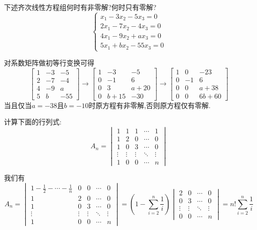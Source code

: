 \documentclass{ctexart}
\begin{document}
\begin{homework}[2]
    下述齐次线性方程组何时有非零解?何时只有零解?
    \[\left\{\begin{array}{l}
        x_1-3x_2-5x_3=0\\
        2x_1-7x_2-4x_3=0\\
        4x_1-9x_2+ax_3=0\\
        5x_1+bx_2-55x_3=0
    \end{array}\right.\]
\end{homework}
\begin{solution}
    对系数矩阵做初等行变换可得
    \[\begin{bmatrix}
        1&-3&-5\\
        2&-7&-4\\
        4&-9&a\\
        5&b&-55
    \end{bmatrix}\longrightarrow\begin{bmatrix}
        1&-3&-5\\
        0&-1&6\\
        0&3&a+20\\
        0&b+15&-30
    \end{bmatrix}\longrightarrow\begin{bmatrix}
        1&0&-23\\
        0&-1&6\\
        0&0&a+38\\
        0&0&6b+60
    \end{bmatrix}\]
    当且仅当$a=-38$且$b=-10$时原方程有非零解,否则原方程仅有零解.
\end{solution}
\begin{homework}[3]
    计算下面的行列式:
    \[A_n=\begin{vmatrix}
        1&1&1&\cdots&1\\
        1&2&0&\cdots&0\\
        1&0&3&\cdots&0\\
        \vdots&\vdots&\vdots&\ddots&\vdots\\
        1&0&0&\cdots&n
    \end{vmatrix}\]
\end{homework}
\begin{solution}
    我们有
    \[A_n=\begin{vmatrix}
        1-\frac12-\cdots-\frac1n&0&0&\cdots&0\\
        1&2&0&\cdots&0\\
        1&0&3&\cdots&0\\
        \vdots&\vdots&\vdots&\ddots&\vdots\\
        1&0&0&\cdots&n
    \end{vmatrix}=\left(1-\sum_{i=2}^{n}\dfrac1i\right)\begin{vmatrix}
        2&0&\cdots&0\\
        0&3&\cdots&0\\
        \vdots&\vdots&\ddots&\vdots\\
        0&0&\cdots&n
    \end{vmatrix}=n!\sum_{i=2}^{n}\dfrac1i\]
\end{solution}
\end{document}
